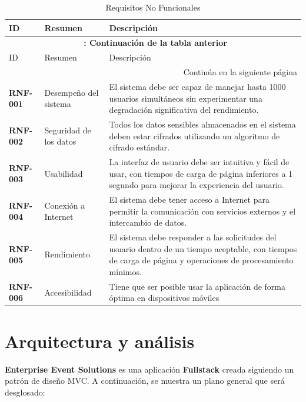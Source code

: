     \begin{longtable}{ p{2.5cm} p{4cm} p{9cm} }
        \caption{Requisitos No Funcionales} \label{tabla:RNF} \\
        \hline
        ID & Resumen & Descripción \\
        \hline
        \endfirsthead
        \multicolumn{3}{c}{{\bfseries \tablename\ \thetable{}: Continuación de la tabla anterior}} \\
        \hline
        ID & Resumen & Descripción \\
        \hline
        \endhead
        \hline \multicolumn{3}{|r|}{{Continúa en la siguiente página}} \\ \hline
        \endfoot
        \hline
        \endlastfoot
        \textbf{RNF-001} & Desempeño del sistema & El sistema debe ser capaz de manejar hasta 1000 usuarios simultáneos sin experimentar una degradación 
        significativa del rendimiento. \\
        \textbf{RNF-002} & Seguridad de los datos & Todos los datos sensibles almacenados en el sistema deben estar cifrados utilizando un algoritmo de cifrado 
        estándar. \\
        \textbf{RNF-003} & Usabilidad & La interfaz de usuario debe ser intuitiva y fácil de usar, con tiempos de carga de página inferiores a 1 segundo para 
        mejorar la experiencia del usuario. \\
        \textbf{RNF-004} &  Conexión a Internet & El sistema debe tener acceso a Internet para permitir la comunicación con servicios externos y el intercambio
         de datos. \\
        \textbf{RNF-005} & Rendimiento & El sistema debe responder a las solicitudes del usuario dentro de un tiempo aceptable, con tiempos de carga de página y
         operaciones de procesamiento mínimos. \\
        \textbf{RNF-006} & Accesibilidad & Tiene que ser posible usar la aplicación de forma óptima en dispositivos móviles\\ 
    \end{longtable}

\section{Arquitectura y análisis}

\textbf{Enterprise Event Solutions} es una aplicación \textbf{Fullstack} creada siguiendo un patrón de diseño MVC. A continuación, se muestra un plano general
que será desglosado:


